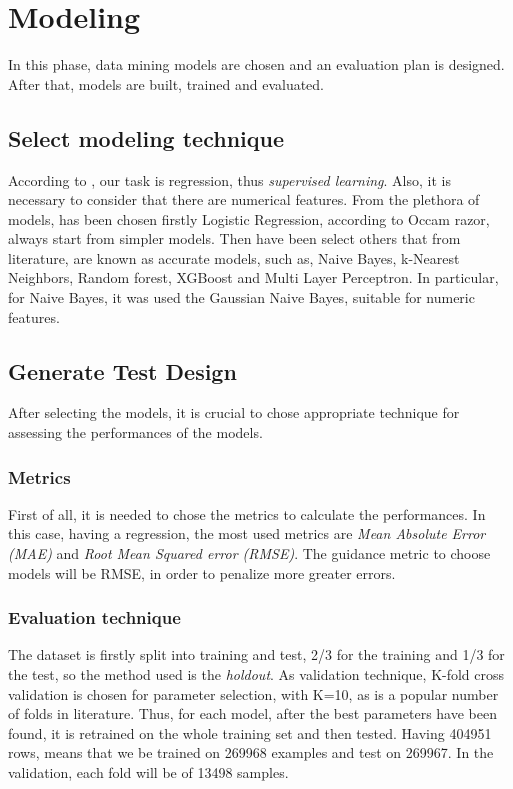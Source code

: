 \section{Modeling}

In this phase, data mining models are chosen and an evaluation plan is designed. After that, models are built, trained and evaluated.
\subsection{Select modeling technique}

According to , our task is regression, thus \textit{supervised learning}. Also, it is necessary to consider that there are numerical features. From the plethora of models, has been chosen firstly Logistic Regression, according to Occam razor, always start from simpler models. Then have been select others that from literature, are known as accurate models, such as, Naive Bayes, k-Nearest Neighbors, Random forest, XGBoost and Multi Layer Perceptron. 
In particular, for Naive Bayes, it was used the Gaussian Naive Bayes, suitable for numeric features.


\subsection{Generate Test Design}

After selecting the models, it is crucial to chose appropriate technique for assessing the performances of the models.

\subsubsection{Metrics}

First of all, it is needed to chose the metrics to calculate the performances. In this case, having a regression, the most used metrics are \textit{Mean Absolute Error (MAE)} and \textit{Root Mean Squared error (RMSE)}. The guidance metric to choose models will be RMSE, in order to penalize more greater errors.

\subsubsection{Evaluation technique}

The dataset is firstly split into training and test, 2/3 for the training and 1/3 for the test, so the method used is the \textit{holdout}. 
As validation technique, K-fold cross validation is chosen for parameter selection, with K=10, as is a popular number of folds in literature.
Thus, for each model, after the best parameters have been found, it is retrained on the whole training set and then tested.
Having 404951 rows, means that we be trained on 269968 examples and test on 269967. In the validation, each fold will be of 13498 samples.


